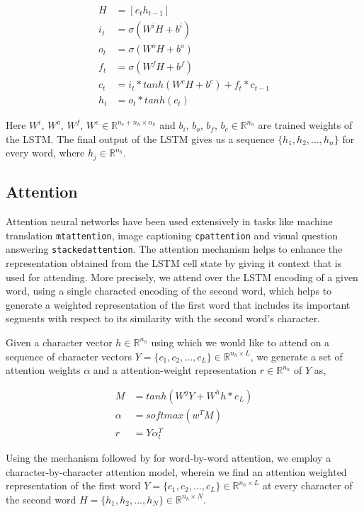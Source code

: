 \documentclass[11pt,letterpaper]{article}
\begin{document}
\begin{align}
H &= [e_t h_{t-1}] \\
i_t &= \sigma (W^iH + b^i) \\
o_t &= \sigma (W^oH + b^o) \\
f_t &= \sigma (W^fH + b^f) \\
c_t &= i_t * tanh(W^cH + b^c) + f_t * c_{t-1} \\
h_t &= o_t * tanh(c_t)
\end{align}

Here $W^i$, $W^o$, $W^f$, $W^c \in  \mathbb{R}^{n_e+n_h \times n_h}$ and $b_i$, $b_o$, $b_f$, $b_c \in \mathbb{R}^{n_h}$ are trained weights of the LSTM. The final output of the LSTM gives us a sequence $\{h_1, h_2, ..., h_n\}$ for every word, where $h_j \in \mathbb{R}^{n_h}$.

\subsection{Attention}

Attention neural networks have been used extensively in tasks like machine translation \texttt{mtattention}, image captioning \texttt{cpattention} and visual question answering \texttt{stackedattention}. The attention mechanism helps to enhance the representation obtained from the LSTM cell state by giving it context that is used for attending. More precisely, we attend over the LSTM encoding of a given word, using a single characted encoding of the second word, which helps to generate a weighted representation of the first word that includes its important segments with respect to its similarity with the second word's character. 

Given a character vector $h \in  \mathbb{R}^{n_h}$ using which we would like to attend on a sequence of character vectors $Y = \{c_1, c_2, ..., c_L\} \in \mathbb{R}^{n_h \times L}$, we generate a set of attention weights $\alpha$ and a attention-weight representation $r \in  \mathbb{R}^{n_h}$ of $Y$ as,

\begin{align}
M &= tanh(W^yY + W^hh*e_L) \\
\alpha &= softmax(w^TM) \\
r &= Y\alpha_t^T
\end{align}

Using the mechanism followed by \cite{rocktaschel2016reasoning} for word-by-word attention, we employ a character-by-character attention model, wherein we find an attention weighted representation of the first word $Y = \{c_1, c_2, ..., c_L\} \in \mathbb{R}^{n_h \times L}$ at every character of the second word $H = \{h_1, h_2, ..., h_N\} \in \mathbb{R}^{n_h \times N}$.
\end{document}
